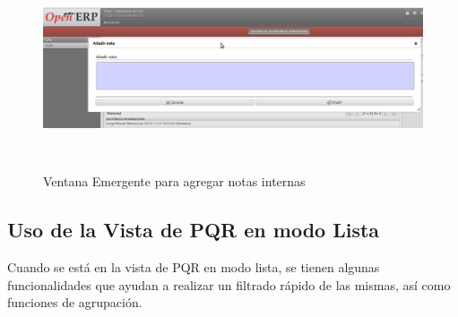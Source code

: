 \begin{figure}[H]
 \centering
 \includegraphics[width=17cm,height=6cm]{./Imagenes/addnote.png}
 \caption{Ventana Emergente para agregar notas internas}
 \label{fig:addnote}
\end{figure}

\subsection{Uso de la Vista de PQR en modo Lista}

Cuando se está en la vista de PQR en modo lista, se tienen algunas funcionalidades que ayudan a realizar un filtrado rápido de las mismas,
así como funciones de agrupación. 

